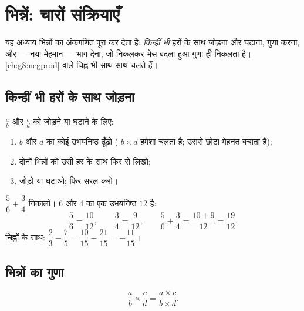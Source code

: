 \chapter{भिन्नें: चारों संक्रियाएँ}\label{ch:g8:fractions}

यह अध्याय भिन्नों का अंकगणित पूरा कर देता है: \emph{किन्हीं भी} हरों
के साथ जोड़ना और घटाना, गुणा करना, और --- नया मेहमान --- भाग देना,
जो निकलकर भेस बदला हुआ गुणा ही निकलता है। \cref{ch:g8:negprod} वाले
चिह्न भी साथ-साथ चलते हैं।

\section{किन्हीं भी हरों के साथ जोड़ना}

\begin{method}[उभयनिष्ठ हर]\label{met:g8:fractions:add}
$\frac ab$ और $\frac cd$ को जोड़ने या घटाने के लिए:
\begin{enumerate}
  \item $b$ और $d$ का कोई उभयनिष्ठ  ढूँढ़ो (
        $b \times d$ हमेशा चलता है; उससे छोटा  मेहनत बचाता है);
  \item दोनों भिन्नों को उसी हर के साथ फिर से लिखो;
  \item {} जोड़ो या घटाओ; फिर सरल करो।
\end{enumerate}
\end{method}

\begin{example}\label{ex:g8:fractions:add}
$\dfrac{5}{6} + \dfrac{3}{4}$ निकालो। $6$ और $4$ का एक उभयनिष्ठ
 $12$ है:
\[
\frac{5}{6} = \frac{10}{12},
\qquad
\frac{3}{4} = \frac{9}{12},
\qquad
\frac{5}{6} + \frac{3}{4} = \frac{10 + 9}{12} = \frac{19}{12}.
\]
चिह्नों के साथ: $\dfrac{2}{3} - \dfrac{7}{5} = \dfrac{10}{15} -
\dfrac{21}{15} = -\dfrac{11}{15}$।
\end{example}

\section{भिन्नों का गुणा}

\begin{theorem}[भिन्नों का गुणनफल]\label{thm:g8:fractions:mult}
\[
\frac{a}{b} \times \frac{c}{d} = \frac{a \times c}{b \times d} .
\]
\end{theorem}

